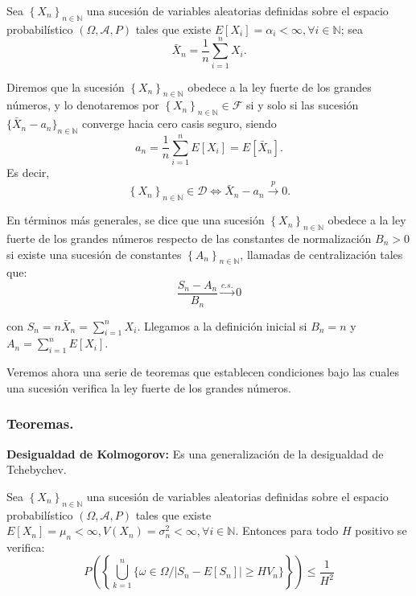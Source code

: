 \begin{definicion}
Sea $ \left\{X_n\right\}_{n\in\mathbb{N}}$ una sucesi\'on de variables aleatorias definidas sobre el espacio probabil\'istico $\left(\Omega,\mathcal{A}, P\right) $ tales que existe $E[X_i]=\alpha_i<\infty,\forall i \in\mathbb{N}$; sea
\begin{equation*}
\bar{X}_n=\dfrac{1}{n}\sum_{i=1}^{n}X_i.
\end{equation*}

Diremos que la sucesi\'on $ \left\{X_n\right\}_{n\in\mathbb{N}}$ obedece a la ley fuerte de los grandes n\'umeros, y lo denotaremos por $ \left\{X_n\right\}_{n\in\mathbb{N}}\in\mathscr{F}$ si y solo si las sucesi\'on $\{\bar{X}_n-a_n\}_{n\in\mathbb{N}}$ converge hacia cero casis seguro, siendo 
\begin{equation*}
a_n=\dfrac{1}{n}\sum_{i=1}^{n}E[X_i]=E[\bar{X}_n].
\end{equation*}
Es decir,
\begin{equation*}
\left\{X_n\right\}_{n\in\mathbb{N}}\in\mathscr{D}\Leftrightarrow \bar{X}_n-a_n\overset{p}{\to} 0.
\end{equation*}
\end{definicion}

En t\'erminos m\'as generales, se dice que una sucesi\'on $ \left\{X_n\right\}_{n\in\mathbb{N}}$ obedece a la ley fuerte de los grandes n\'umeros respecto de las constantes de normalizaci\'on $B_n>0$ si existe una sucesi\'on de constantes $ \left\{A_n\right\}_{n\in\mathbb{N}}$, llamadas de centralizaci\'on tales que:
\begin{equation*}
\dfrac{S_n-A_n}{B_n}\overset{c.s.}{\to}0
\end{equation*}

con $S_n=n\bar{X}_n=\sum_{i=1}^{n}X_i$. Llegamos a la definici\'on inicial si $B_n=n$ y $A_n=\sum_{i=1}^{n}E[X_i]$.

Veremos ahora una serie de teoremas que establecen condiciones bajo las cuales una sucesi\'on verifica la ley fuerte de los grandes n\'umeros.

\subsubsection{Teoremas.}

\textbf{Desigualdad de Kolmogorov:} Es una generalizaci\'on de la desigualdad de Tchebychev.

Sea $ \left\{X_n\right\}_{n\in\mathbb{N}}$ una sucesi\'on de variables aleatorias definidas sobre el espacio probabil\'istico $\left(\Omega,\mathcal{A}, P\right) $ tales que existe $E[X_n]=\mu_n<\infty, V(X_n)=\sigma_n^2<\infty,\forall i \in\mathbb{N}$. Entonces para todo $H$ positivo se verifica:
\begin{equation*}
P\left(\left\{\bigcup_{k=1}^n\{\omega\in\Omega/\left|S_n-E[S_n]\right|\geq HV_n\}\right\}\right)\leq\dfrac{1}{H^2}
\end{equation*}

